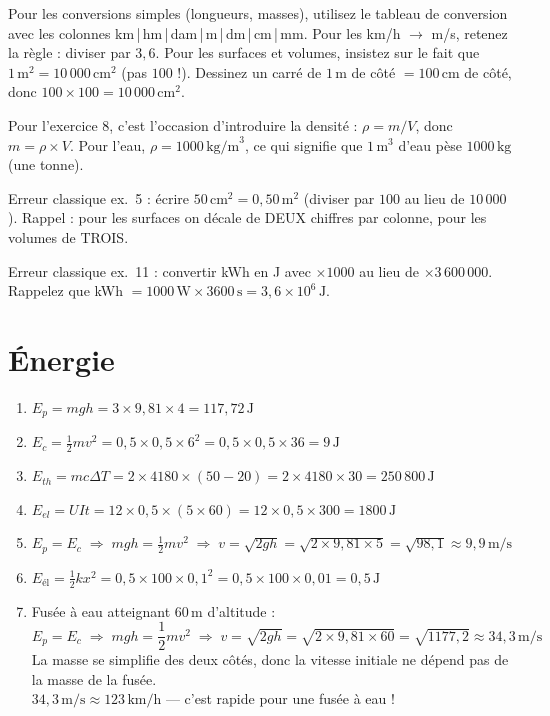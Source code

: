 \documentclass[11pt,a4paper]{article}
\newcommand{\corrbox}[1]{
\begin{tcolorbox}[colback=correctgreen!8!white,colframe=correctgreen!60!black]
#1
\end{tcolorbox}
}
\newcommand{\tipbox}[1]{
\begin{tcolorbox}[colback=tipblue!8!white,colframe=tipblue!60!black,title=\textbf{Comment expliquer}]
#1
\end{tcolorbox}
}
\newcommand{\warnbox}[1]{
\begin{tcolorbox}[colback=warnred!8!white,colframe=warnred!60!black,title=\textbf{Erreurs fr\'equentes}]
#1
\end{tcolorbox}
}
\begin{document}
\tipbox{
Pour les conversions simples (longueurs, masses), utilisez le tableau de conversion avec les colonnes km\,|\,hm\,|\,dam\,|\,m\,|\,dm\,|\,cm\,|\,mm. Pour les km/h $\rightarrow$ m/s, retenez la r\`egle : diviser par $3{,}6$. Pour les surfaces et volumes, insistez sur le fait que $1\,\text{m}^{2} = 10\,000\,\text{cm}^{2}$ (pas $100$ !). Dessinez un carr\'e de $1\,\text{m}$ de c\^ot\'e $= 100\,\text{cm}$ de c\^ot\'e, donc $100 \times 100 = 10\,000\,\text{cm}^{2}$.

\vspace{0.2cm}
Pour l'exercice 8, c'est l'occasion d'introduire la densit\'e : $\rho = m/V$, donc $m = \rho \times V$. Pour l'eau, $\rho = 1000\,\text{kg/m}^{3}$, ce qui signifie que $1\,\text{m}^{3}$ d'eau p\`ese $1000\,\text{kg}$ (une tonne).
}

\warnbox{
Erreur classique ex.~5 : \'ecrire $50\,\text{cm}^{2} = 0{,}50\,\text{m}^{2}$ (diviser par $100$ au lieu de $10\,000$). Rappel : pour les surfaces on d\'ecale de DEUX chiffres par colonne, pour les volumes de TROIS.

\vspace{0.2cm}
Erreur classique ex.~11 : convertir kWh en J avec $\times 1000$ au lieu de $\times 3\,600\,000$. Rappelez que kWh $= 1000\,\text{W} \times 3600\,\text{s} = 3{,}6 \times 10^{6}\,\text{J}$.
}

\section{\'Energie}

\corrbox{
\begin{enumerate}
\item $E_p = mgh = 3 \times 9{,}81 \times 4 = 117{,}72\,\text{J}$
\item $E_c = \frac{1}{2}mv^{2} = 0{,}5 \times 0{,}5 \times 6^{2} = 0{,}5 \times 0{,}5 \times 36 = 9\,\text{J}$
\item $E_{th} = mc\Delta T = 2 \times 4180 \times (50 - 20) = 2 \times 4180 \times 30 = 250\,800\,\text{J}$
\item $E_{el} = UIt = 12 \times 0{,}5 \times (5 \times 60) = 12 \times 0{,}5 \times 300 = 1800\,\text{J}$
\item $E_p = E_c \;\Rightarrow\; mgh = \frac{1}{2}mv^{2} \;\Rightarrow\; v = \sqrt{2gh} = \sqrt{2 \times 9{,}81 \times 5} = \sqrt{98{,}1} \approx 9{,}9\,\text{m/s}$
\item $E_{\text{\'el}} = \frac{1}{2}kx^{2} = 0{,}5 \times 100 \times 0{,}1^{2} = 0{,}5 \times 100 \times 0{,}01 = 0{,}5\,\text{J}$
\item Fus\'ee \`a eau atteignant $60\,\text{m}$ d'altitude :
\[E_p = E_c \;\Rightarrow\; mgh = \frac{1}{2}mv^{2} \;\Rightarrow\; v = \sqrt{2gh} = \sqrt{2 \times 9{,}81 \times 60} = \sqrt{1177{,}2} \approx 34{,}3\,\text{m/s}\]
La masse se simplifie des deux c\^ot\'es, donc la vitesse initiale ne d\'epend pas de la masse de la fus\'ee.\\
$34{,}3\,\text{m/s} \approx 123\,\text{km/h}$ --- c'est rapide pour une fus\'ee \`a eau !
\end{enumerate}
}
\end{document}
